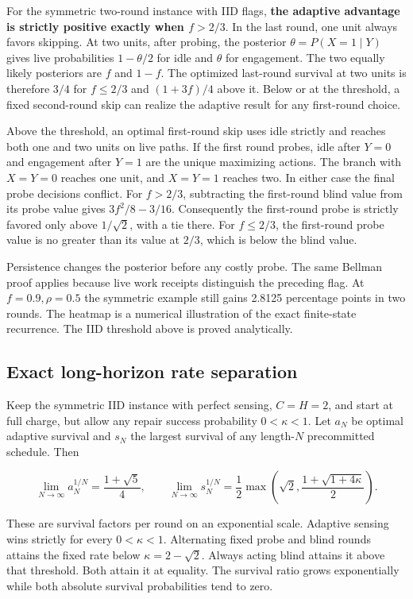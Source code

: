 \documentclass[
  11pt,
]{article}
\begin{document}
For the symmetric two-round instance with IID flags, \textbf{the
adaptive advantage is strictly positive exactly when \(f>2/3\)}. In the
last round, one unit always favors skipping. At two units, after
probing, the posterior \(\theta=P(X=1\mid Y)\) gives live probabilities
\(1-\theta/2\) for idle and \(\theta\) for engagement. The two equally
likely posteriors are \(f\) and \(1-f\). The optimized last-round
survival at two units is therefore \(3/4\) for \(f\le2/3\) and
\((1+3f)/4\) above it. Below or at the threshold, a fixed second-round
skip can realize the adaptive result for any first-round choice.

Above the threshold, an optimal first-round skip uses idle strictly and
reaches both one and two units on live paths. If the first round probes,
idle after \(Y=0\) and engagement after \(Y=1\) are the unique
maximizing actions. The branch with \(X=Y=0\) reaches one unit, and
\(X=Y=1\) reaches two. In either case the final probe decisions
conflict. For \(f>2/3\), subtracting the first-round blind value from
its probe value gives \(3f^2/8-3/16\). Consequently the first-round
probe is strictly favored only above \(1/\sqrt2\), with a tie there. For
\(f\le2/3\), the first-round probe value is no greater than its value at
\(2/3\), which is below the blind value.

Persistence changes the posterior before any costly probe. The same
Bellman proof applies because live work receipts distinguish the
preceding flag. At \(f=0.9,\rho=0.5\) the symmetric example still gains
2.8125 percentage points in two rounds. The heatmap is a numerical
illustration of the exact finite-state recurrence. The IID threshold
above is proved analytically.

\subsection{Exact long-horizon rate
separation}\label{exact-long-horizon-rate-separation}

Keep the symmetric IID instance with perfect sensing, \(C=H=2\), and
start at full charge, but allow any repair success probability
\(0<\kappa<1\). Let \(a_N\) be optimal adaptive survival and \(s_N\) the
largest survival of any length-\(N\) precommitted schedule. Then

\[
\lim_{N\to\infty} a_N^{1/N}=\frac{1+\sqrt5}{4},\qquad
\lim_{N\to\infty} s_N^{1/N}
 =\frac12\max\!\left(\sqrt2,\frac{1+\sqrt{1+4\kappa}}2\right).
\]

These are survival factors per round on an exponential scale. Adaptive
sensing wins strictly for every \(0<\kappa<1\). Alternating fixed probe
and blind rounds attains the fixed rate below \(\kappa=2-\sqrt2\).
Always acting blind attains it above that threshold. Both attain it at
equality. The survival ratio grows exponentially while both absolute
survival probabilities tend to zero.
\end{document}
